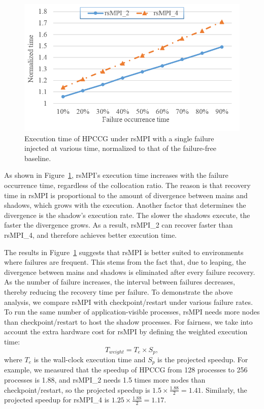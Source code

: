 \begin{figure}[!t]
  \begin{center}
      \includegraphics[width=0.6\columnwidth]{Figures/single_failure_rsmpi}
  \end{center}
  \vskip -0.2in
  \caption{Execution time of HPCCG under rsMPI with a single failure injected at various time, normalized to that of the failure-free baseline.}
  \label{fig:single_failure}
\end{figure}

As shown in Figure~\ref{fig:single_failure}, rsMPI's execution time increases with the failure occurrence time, regardless of the collocation ratio. The reason is that recovery time in rsMPI is proportional to the amount of divergence between mains and shadows, which grows with the execution. 
Another factor that determines the divergence is the shadow's execution rate. The slower the shadows execute, the faster the divergence grows. As a result, rsMPI\_2 can recover faster than rsMPI\_4, and therefore achieves better execution time.



The results in Figure~\ref{fig:single_failure} suggests that rsMPI is better suited to environments where failures are frequent. 
This stems from the fact that, due to leaping, the divergence between mains and shadows is eliminated after every failure recovery. As the number of failure increases, the interval between failures decreases, thereby reducing the recovery time per failure.
To demonstrate the above analysis, we compare rsMPI with checkpoint/restart under various failure rates. 
To run the same number of application-visible processes, rsMPI needs more nodes than checkpoint/restart to host the shadow processes. 
For fairness, we take into account the extra hardware cost for rsMPI by defining the weighted execution time:
$$T_{weight} = T_e \times S_p,$$ where $T_e$ is the wall-clock execution time and $S_p$ is the projected speedup. For example, we measured that the speedup of HPCCG from 128 processes to 256 processes is 1.88, and rsMPI\_2 needs 1.5 times more nodes than checkpoint/restart, so the projected speedup is $1.5\times\frac{1.88}{2}=1.41$. Similarly, the projected speedup for rsMPI\_4 is $1.25\times\frac{1.88}{2}=1.17$.


